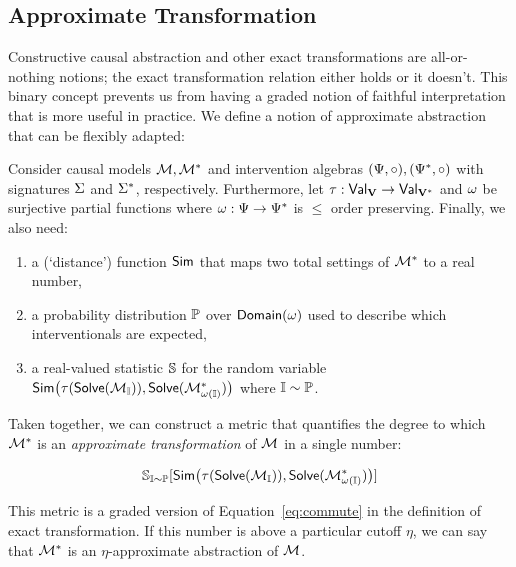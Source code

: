 \documentclass[twoside,11pt]{article}
\begin{document}
\subsection{Approximate Transformation} \label{section:approximate}
Constructive causal abstraction and other exact transformations are all-or-nothing notions; the exact transformation relation either holds or it doesn't. This binary concept prevents us from having a graded notion of faithful interpretation that is more useful in practice. We define a notion of approximate abstraction \citep{beckers20a, Rischel, Zennaro23b} that can be flexibly adapted:
\begin{definition} \label{def:approx} Consider causal models $\mathcal{M}, \mathcal{M}^*$ and intervention algebras $(\Psi, \circ), (\Psi^*, \circ)$ with signatures $\Sigma$ and $\Sigma^*$, respectively. Furthermore, let  $\tau: \mathsf{Val}_{\mathbf{V}} \to \mathsf{Val}_{\mathbf{V}^*}$ and $\omega$ be surjective partial functions where $\omega: \Psi \to \Psi^*$ is $\leq$ order preserving. Finally, we also need:
\begin{enumerate}
    \item a (`distance') function $\mathsf{Sim}$ that maps two total settings of $\mathcal{M}^*$ to a real number,
    \item a probability distribution $\mathbb{P}$ over $\mathsf{Domain}(\omega)$ used to describe which interventionals are expected,
    \item a real-valued statistic $\mathbb{S}$ for the random variable $\mathsf{Sim}\big(\tau(\mathsf{Solve}(\mathcal{M}_{\mathbb{I}}) ), \mathsf{Solve}(\mathcal{M}^*_{\omega(\mathbb{I})} )\big)$ where $ \mathbb{I} \sim \mathbb{P}$.
\end{enumerate}
Taken together, we can construct a metric that quantifies the degree to which $\mathcal{M}^*$ is an \textit{approximate transformation} of $\mathcal{M}$ in a single number:

\begin{equation}
 \mathbb{S}_{\mathbb{I}\sim \mathbb{P}}[\mathsf{Sim}\big( \tau(\mathsf{Solve}(\mathcal{M}_{\mathbb{I}}) ), \mathsf{Solve}(\mathcal{M}^*_{\omega(\mathbb{I})} )\big) ]\label{eq:approxtrans}
\end{equation}

This metric is a graded version of Equation~\ref{eq:commute} in the definition of exact transformation. If this number is above a particular cutoff $\eta$, we can say that $\mathcal{M}^*$ is an $\eta$-approximate abstraction of $\mathcal{M}$.
\end{definition}
\end{document}
